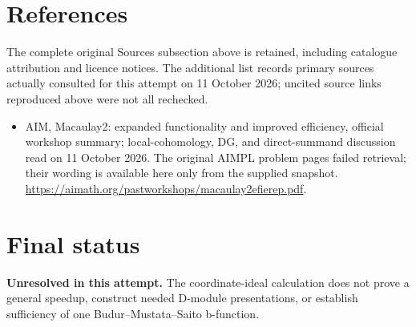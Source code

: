 \documentclass[11pt]{article}
\begin{document}
\section{References}
The complete original Sources subsection above is retained, including catalogue attribution and licence notices. The additional list records primary sources actually consulted for this attempt on 11 October 2026; uncited source links reproduced above were not all rechecked.
\begin{itemize}
\item AIM, Macaulay2: expanded functionality and improved efficiency, official workshop summary; local-cohomology, DG, and direct-summand discussion read on 11 October 2026. The original AIMPL problem pages failed retrieval; their wording is available here only from the supplied snapshot. \url{https://aimath.org/pastworkshops/macaulay2efierep.pdf}.
\end{itemize}
\section{Final status}
\textbf{Unresolved in this attempt.} The coordinate-ideal calculation does not prove a general speedup, construct needed D-module presentations, or establish sufficiency of one Budur--Mustata--Saito b-function.
\end{document}
